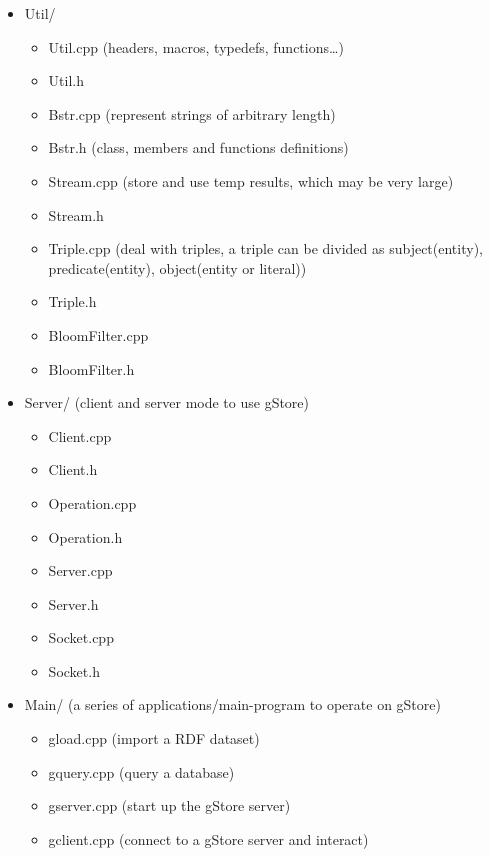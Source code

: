 \documentclass[titlepage, a4paper, 12pt]{article}
\begin{document}
\begin{itemize}
\item
  Util/

  \begin{itemize}
  \item
    Util.cpp (headers, macros, typedefs, functions\ldots{})
  \item
    Util.h
  \item
    Bstr.cpp (represent strings of arbitrary length)
  \item
    Bstr.h (class, members and functions definitions)
  \item
    Stream.cpp (store and use temp results, which may be very large)
  \item
    Stream.h
  \item
    Triple.cpp (deal with triples, a triple can be divided as
    subject(entity), predicate(entity), object(entity or literal))
  \item
    Triple.h
  \item
    BloomFilter.cpp
  \item
    BloomFilter.h
  \end{itemize}
\end{itemize}


\begin{itemize}
\item
  Server/ (client and server mode to use gStore)

  \begin{itemize}
  \item
    Client.cpp
  \item
    Client.h
  \item
    Operation.cpp
  \item
    Operation.h
  \item
    Server.cpp
  \item
    Server.h
  \item
    Socket.cpp
  \item
    Socket.h
  \end{itemize}
\item
  Main/ (a series of applications/main-program to operate on gStore)

  \begin{itemize}
  \item
    gload.cpp (import a RDF dataset)
  \item
    gquery.cpp (query a database)
  \item
    gserver.cpp (start up the gStore server)
  \item
    gclient.cpp (connect to a gStore server and interact)
  \end{itemize}
\end{itemize}
\end{document}
